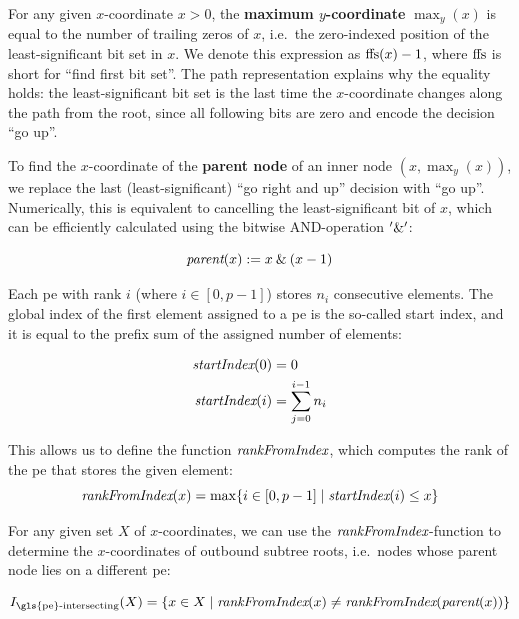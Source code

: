 For any given $x$-coordinate $x > 0$, the \textbf{maximum $y$-coordinate} $\max_y(x)$ is equal to the number of trailing zeros of $x$, i.e.\ the zero-indexed position of the least-significant bit set in $x$.
We denote this expression as $\textrm{ffs} (x) - 1$, where $\textrm{ffs}$ is short for \enquote{find first bit set}.
The path representation explains why the equality holds: the least-significant bit set is the last time the $x$-coordinate changes along the path from the root, since all following bits are zero and encode the decision \enquote{go up}.

To find the $x$-coordinate of the \textbf{parent node} of an inner node $(x, \max_y(x))$, we replace the last (least-significant) \enquote{go right and up} decision with \enquote{go up}. 
Numerically, this is equivalent to cancelling the least-significant bit of $x$, which can be efficiently calculated using the bitwise AND-operation $'\mathbin{\&}'$:

\begin{equation}
\label{eq:parent}
\textit{parent} (x) := x \mathbin{\&} (x - 1)
\end{equation}

Each \gls{pe} with rank $i$ (where $i \in [0, p - 1]$) stores $n_i$ consecutive elements.
The global index of the first element assigned to a \gls{pe} is the so-called start index, and it is equal to the prefix sum of the assigned number of elements:

\begin{align}
\textit{startIndex} (0) &= 0 \\
\textit{startIndex} (i) &= \sum_{j = 0}^{i - 1} n_i
\label{eq:startIndex}
\end{align}

This allows us to define the function $\textit{rankFromIndex}$, which computes the rank of the \gls{pe} that stores the given element:
\begin{equation}
\textit{rankFromIndex} (x) = \max \{i \in [0, p - 1] \;|\; \textit{startIndex} (i) \leq x \}
\end{equation}

For any given set $X$ of $x$-coordinates, we can use the $\textit{rankFromIndex}$-function to determine the $x$-coordinates of outbound subtree roots, i.e.\ nodes whose parent node lies on a different \gls{pe}:

\newcommand{\rankIntersectingIndices}{I_{\textrm{\gls{pe}-intersecting}}}
\begin{equation}
\rankIntersectingIndices (X) = \{x \in X \;|\; \rankFromIndex (x) \neq \rankFromIndex (\parent (x)) \}
\end{equation}

